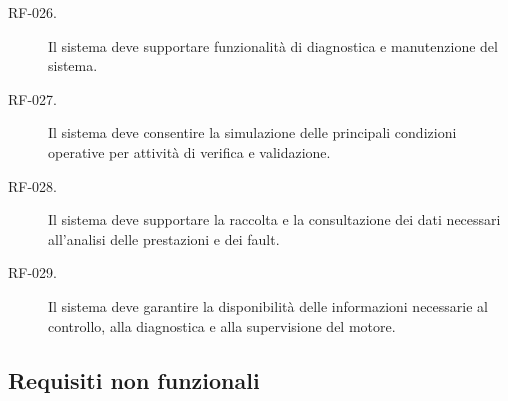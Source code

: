 \documentclass{article}
\begin{document}
\begin{description}
    \item[RF-026.] Il sistema deve supportare funzionalità di diagnostica e
          manutenzione del sistema.

    \item[RF-027.] Il sistema deve consentire la simulazione delle principali
          condizioni operative per attività di verifica e validazione.

    \item[RF-028.] Il sistema deve supportare la raccolta e la consultazione dei
          dati necessari all'analisi delle prestazioni e dei fault.

    \item[RF-029.] Il sistema deve garantire la disponibilità delle informazioni
          necessarie al controllo, alla diagnostica e alla supervisione del
          motore.
\end{description}

\subsection{Requisiti non funzionali}
\end{document}
